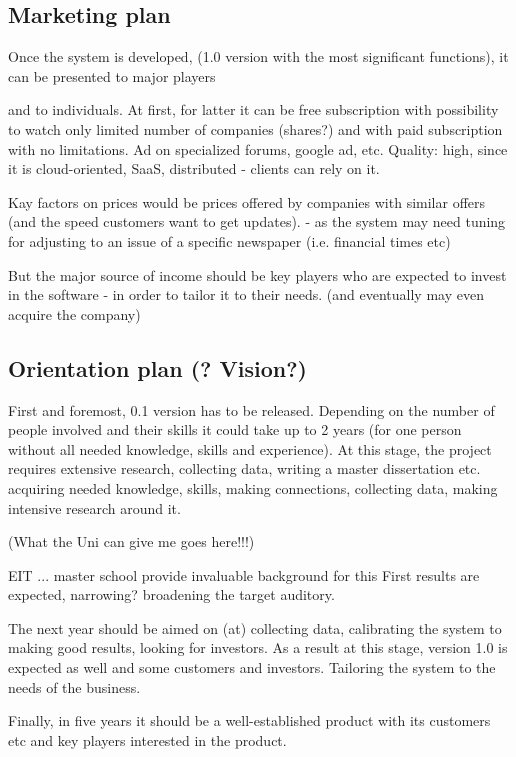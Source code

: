 \documentclass[a4paper,12pt]{article}
\begin{document}
\subsection*{Marketing plan}

Once the system is developed, (1.0 version with the most significant functions), it can be presented to major players

and to individuals.
At first, for latter it can be free subscription with possibility to watch only limited number of companies (shares?) and with paid subscription with no limitations.
Ad on specialized forums, google ad, etc.
Quality: high, since it is cloud-oriented, SaaS, distributed - clients can rely on it.

Kay factors on prices would be prices offered by companies with similar offers (and the speed customers want to get updates). - as the system may need tuning for adjusting to an issue of a specific newspaper (i.e. financial times etc)

But the major source of income should be key players who are expected to invest in the software - in order to tailor it to their needs. (and eventually may even acquire the company)

\subsection*{Orientation plan (? Vision?)}

First and foremost, 0.1 version has to be released. Depending on the number of people involved and their skills it could take up to 2 years (for one person without all needed knowledge, skills and experience). At this stage, the project requires extensive research, collecting data, writing a master dissertation etc.
acquiring needed knowledge, skills, making connections, collecting data, making intensive research around it.

(What the Uni can give me goes here!!!)

EIT ... master school provide invaluable background for this
First results are expected, narrowing? broadening the target auditory.

The next year should be aimed on (at) collecting data, calibrating the system to making good results, looking for investors. As a result at this stage, version 1.0 is expected as well and some customers and investors. Tailoring the system to the needs of the business.

Finally, in five years it should be a well-established product with its
customers etc and key players interested in the product.
\end{document}

